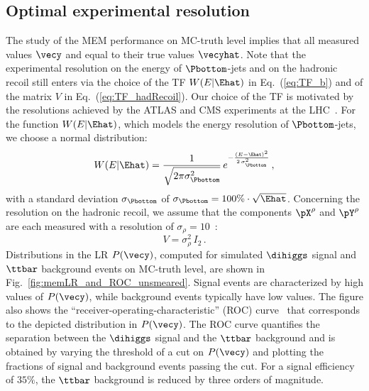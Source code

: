 \subsection{Optimal experimental resolution}

The study of the MEM performance on MC-truth level implies that all measured values $\vecy$ and equal to their true values $\vecyhat$.
Note that the experimental resolution on the energy of $\Pbottom$-jets and on the hadronic recoil still enters via the choice of the TF $W(E|\Ehat)$ in Eq.~(\ref{eq:TF_b})
and of the matrix $V$ in Eq.~(\ref{eq:TF_hadRecoil}).
Our choice of the TF is motivated by the resolutions achieved by the ATLAS and CMS experiments at the LHC~\cite{Aaboud:2017aca,PRF-14-001,Aaboud:2018tkc,JME-17-001}.
For the function $W(E|\Ehat)$, which models the energy resolution of $\Pbottom$-jets,
we choose a normal distribution:
\begin{equation}
W(E|\Ehat) = \frac{1}{\sqrt{2 \pi \sigma_{\Pbottom}^{2}}} \, e^{-\frac{(E - \Ehat)^{2}}{2 \, \sigma_{\Pbottom}^{2}}} \, ,
\label{eq:resolution_b}
\end{equation}
with a standard deviation $\sigma_{\Pbottom}$ of $\sigma_{\Pbottom} = 100\% \cdot \sqrt{\Ehat}$.
Concerning the resolution on the hadronic recoil,
we assume that the components $\pX^{\rho}$ and $\pY^{\rho}$ are each measured with a resolution of $\sigma_{\rho} = 10$~\GeV:
\begin{equation}
V = \sigma_{\rho}^{2} \, I_{2} \, .
\label{eq:resolution_rho}
\end{equation}
Distributions in the LR $P(\vecy)$, computed for simulated $\dihiggs$ signal and $\ttbar$ background events on MC-truth level, are shown in Fig.~\ref{fig:memLR_and_ROC_unsmeared}.
Signal events are characterized by high values of $P(\vecy)$, while background events typically have low values.
The figure also shows the ``receiver-operating-characteristic'' (ROC) curve~\cite{ROCcurve} that corresponds to the depicted distribution in $P(\vecy)$.
The ROC curve quantifies the separation between the $\dihiggs$ signal and the $\ttbar$ background
and is obtained by varying the threshold of a cut on $P(\vecy)$ and plotting the fractions of signal and background events passing the cut.
For a signal efficiency of $35\%$, the $\ttbar$ background is reduced by three orders of magnitude.

